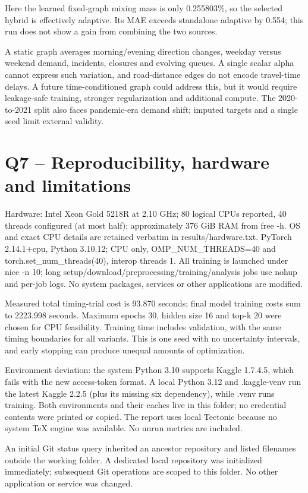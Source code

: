 \documentclass[11pt,a4paper]{article}
\begin{document}
Here the learned fixed-graph mixing mass is only 0.255803\%, so the selected hybrid is effectively adaptive. Its MAE exceeds standalone adaptive by 0.554; this run does not show a gain from combining the two sources.

A static graph averages morning/evening direction changes, weekday versus weekend demand, incidents, closures and evolving queues. A single scalar alpha cannot express such variation, and road-distance edges do not encode travel-time delays. A future time-conditioned graph could address this, but it would require leakage-safe training, stronger regularization and additional compute. The 2020-to-2021 split also faces pandemic-era demand shift; imputed targets and a single seed limit external validity.

\section{Q7 -- Reproducibility, hardware and limitations}
Hardware: Intel Xeon Gold 5218R at 2.10 GHz; 80 logical CPUs reported, 40 threads configured (at most half); approximately 376 GiB RAM from free -h. OS and exact CPU details are retained verbatim in results/hardware.txt. PyTorch 2.14.1+cpu, Python 3.10.12; CPU only, OMP\_NUM\_THREADS=40 and torch.set\_num\_threads(40), interop threads 1. All training is launched under nice -n 10; long setup/download/preprocessing/training/analysis jobs use nohup and per-job logs. No system packages, services or other applications are modified.

Measured total timing-trial cost is 93.870 seconds; final model training costs sum to 2223.998 seconds. Maximum epochs 30, hidden size 16 and top-k 20 were chosen for CPU feasibility. Training time includes validation, with the same timing boundaries for all variants. This is one seed with no uncertainty intervals, and early stopping can produce unequal amounts of optimization.

Environment deviation: the system Python 3.10 supports Kaggle 1.7.4.5, which fails with the new access-token format. A local Python 3.12 and .kaggle-venv run the latest Kaggle 2.2.5 (plus its missing six dependency), while .venv runs training. Both environments and their caches live in this folder; no credential contents were printed or copied. The report uses local Tectonic because no system TeX engine was available. No unrun metrics are included.

An initial Git status query inherited an ancestor repository and listed filenames outside the working folder. A dedicated local repository was initialized immediately; subsequent Git operations are scoped to this folder. No other application or service was changed.
\end{document}

